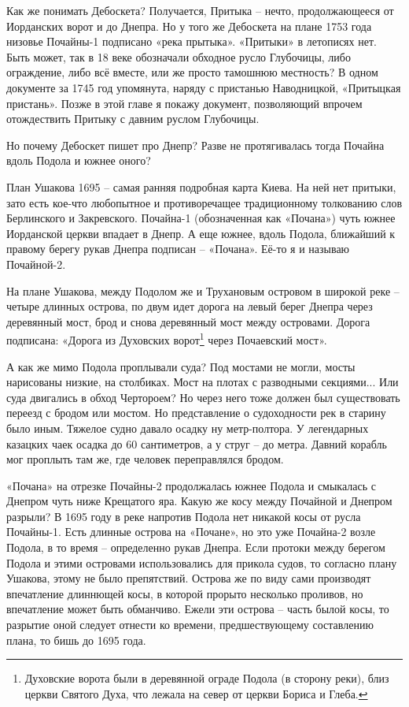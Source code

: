 Как же понимать Дебоскета? Получается, Притыка – нечто, продолжающееся от Иорданских ворот и до Днепра. Но у того же Дебоскета на плане 1753 года низовье Почайны-1 подписано «река прытыка». «Притыки» в летописях нет. Быть может, так в 18 веке обозначали обходное русло Глубочицы, либо ограждение, либо всё вместе, или же просто тамошнюю местность? В одном документе за 1745 год упомянута, наряду с пристанью Наводницкой, «Притыцкая пристань». Позже в этой главе я покажу документ, позволяющий впрочем отождествить Притыку с давним руслом Глубочицы.

Но почему Дебоскет пишет про Днепр? Разве не протягивалась тогда Почайна вдоль Подола и южнее оного?
 
План Ушакова 1695 – самая ранняя подробная карта Киева. На ней нет притыки, зато есть кое-что любопытное и противоречащее традиционному толкованию слов Берлинского и Закревского. Почайна-1 (обозначенная как «Почана») чуть южнее Иорданской церкви впадает в Днепр. А еще южнее, вдоль Подола, ближайший к правому берегу рукав Днепра подписан – «Почана». Её-то я и называю Почайной-2. 

На плане Ушакова, между Подолом же и Трухановым островом в широкой реке – четыре длинных острова, по двум идет дорога на левый берег Днепра через деревянный мост, брод и снова деревянный мост между островами. Дорога подписана: «Дорога из Духовских ворот\footnote{Духовские ворота были в деревянной ограде Подола (в сторону реки), близ церкви Святого Духа, что лежала на север от церкви Бориса и Глеба.} через Почаевский мост».

А как же мимо Подола проплывали суда? Под мостами не могли, мосты нарисованы низкие, на столбиках. Мост на плотах с разводными секциями... Или суда двигались в обход Чертороем? Но через него тоже должен был существовать переезд с бродом или мостом. Но представление о судоходности рек в старину было иным. Тяжелое судно давало осадку ну метр-полтора. У легендарных казацких чаек осадка до 60 сантиметров, а у струг – до метра. Давний корабль мог проплыть там же, где человек переправлялся бродом.

«Почана» на отрезке Почайны-2 продолжалась южнее Подола и смыкалась с Днепром чуть ниже Крещатого яра. Какую же косу между Почайной и Днепром разрыли? В 1695 году в реке напротив Подола нет никакой косы от русла Почайны-1. Есть длинные острова на «Почане», но это уже Почайна-2 возле Подола, в то время – определенно рукав Днепра. Если протоки между берегом Подола и этими островами использовались для прикола судов, то согласно плану Ушакова, этому не было препятствий. Острова же по виду сами производят впечатление длиннющей косы, в которой прорыто несколько проливов, но впечатление может быть обманчиво. Ежели эти острова – часть былой косы, то разрытие оной следует отнести ко времени, предшествующему составлению плана, то бишь до 1695 года.

